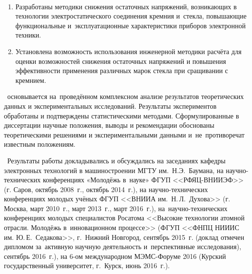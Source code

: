 \novelty %
\begin{enumerate}

\end{enumerate}

\influence\ %
\begin{enumerate}
    \item Разработаны
    методики снижения
    остаточных напряжений, возникающих в технологии
    электростатического соединения кремния и~стекла, повышающие
    функциональные и~эксплуатационные характеристики приборов
    электронной техники.
    \item Установлена возможность использования инженерной
    методики расчёта для оценки возможностей снижения остаточных
    напряжений и повышения эффективности применения различных
    марок стекла при сращивании с кремнием.
\end{enumerate}

\begin{enumerate}

\end{enumerate}

\reliability\ основывается на~проведённом комплексном анализе результатов теоретических данных и экспериментальных исследований.
Результаты экспериментов обработаны и подтверждены статистическими методами.
Сформулированные в диссертации научные положения, выводы и рекомендации обоснованы теоретическими решениями и экспериментальными данными и~не~противоречат известным положениям.

\probation\
Результаты работы докладывались и обсуждались на заседаниях кафедры
электронных технологий в машиностроении \mbox{МГТУ} им.~Н.Э.~Баумана,
на научно-технических конференциях «Молодёжь в~науке» ФГУП \mbox{<<РФЯЦ-ВНИИЭФ>>}
(г. Саров, октябрь 2008~г., октябрь 2014~г.),
на научно-технических конференциях молодых учёных ФГУП <<\mbox{ВНИИА} им.~Н.\,Л.~Духова>> (г. Москва,
март 2010~г.,
март 2013~г., март 2016~г.),
на~научно-технических конференциях молодых специалистов Росатома
<<Высокие технологии атомной отрасли. Молодёжь в~инновационном процессе>> (ФГУП
<<\mbox{ФНПЦ} \mbox{НИИИС} им. Ю.\,Е.~Седакова>>, г.~Нижний Новгород,
сентябрь 2015~г.
(доклад отмечен дипломом за~активную научную деятельность и~перспективные
исследования),
сентябрь 2016~г.),
на 6-ом международном МЭМС\nb-Форуме 2016
(Курский государственный университет, г.~Курск, июнь 2016~г.).

